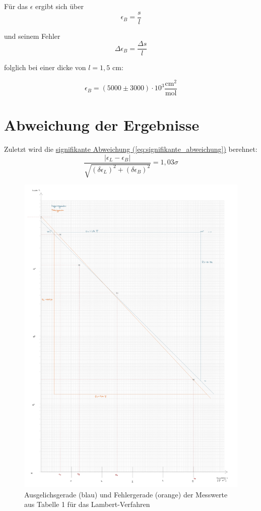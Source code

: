 Für das $\epsilon$ ergibt sich über
\begin{equation}
\epsilon_B = \frac{s}{l} 
\end{equation}

und seinem Fehler 
\begin{equation}
\Delta \epsilon_B = \frac{\Delta  s}{l} 
\end{equation}

folglich bei einer dicke von $l = 1,5$ cm:

\begin{equation}
\boxed{
    \epsilon_B = (5000 \pm 3000) \cdot 10^3 \mathrm{\frac{cm^2}{mol}}
}
\end{equation}

\section{Abweichung der Ergebnisse}
Zuletzt wird die \hyperref[eq:signifikante_abweichung]{signifikante Abweichung (\ref*{eq:signifikante_abweichung})} berehnet:
\begin{equation}
    \frac{\left| \epsilon_L - \epsilon_B \right|}{\sqrt{(\delta \epsilon_L)^2 + (\delta \epsilon_B)^2}} = 1,03\sigma
\end{equation}

\onecolumn
\begin{figure}
    \includegraphics[width=1\textwidth]{img/34/g2--34-Spektralfotometrie.pdf}
    \caption{Ausgelichsgerade (blau) und Fehlergerade (orange) der Messwerte aus Tabelle 1 für das Lambert-Verfahren}
    \label{fig:g_2}
\end{figure}
\twocolumn